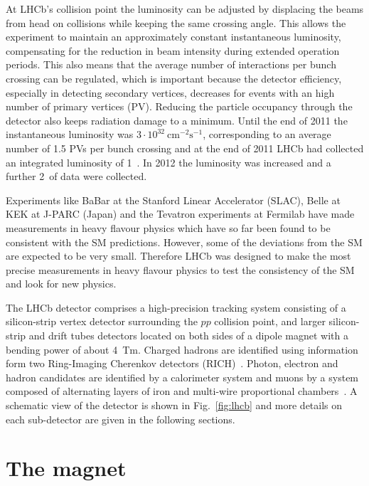 At LHCb's collision point the luminosity can be adjusted by displacing the beams from head on collisions
while keeping the same crossing angle. This allows the experiment to maintain an approximately constant instantaneous
luminosity, compensating for the reduction in beam intensity during extended operation periods. This also means that
the average number of interactions per bunch crossing can be regulated, which is important
because the detector efficiency, especially in detecting secondary vertices, decreases for events with an high number
of primary vertices (PV). Reducing the particle occupancy through the detector also keeps radiation damage to a minimum. 
Until the end of 2011 the instantaneous luminosity was $3 \cdot 10^{32}~\mbox{cm}^{-2}\mbox{s}^{-1}$, corresponding 
to an average number of 1.5 PVs per bunch crossing and at the end of 2011 LHCb had collected an integrated
luminosity of 1~\invfb. In 2012 the luminosity was increased and a further 2~\invfb of data were collected.

Experiments like BaBar at the Stanford Linear Accelerator (SLAC), Belle at KEK at J-PARC (Japan)
and the Tevatron experiments at Fermilab have made measurements in heavy flavour physics
which have so far been found to be consistent with the SM predictions. However, some of the deviations from the
SM are expected to be very small. Therefore LHCb was designed to make the most precise measurements
in heavy flavour physics to test the consistency of the SM and look for new physics.

The LHCb detector comprises a high-precision tracking system consisting of a silicon-strip
vertex detector surrounding the $pp$ collision point, and larger silicon-strip and drift tubes detectors located
on both sides of a dipole magnet with a bending power of about 4~Tm.
Charged hadrons are identified using information form two
Ring-Imaging Cherenkov detectors (RICH)~\cite{LHCb-DP-2012-003}. Photon, electron and hadron candidates are
identified by a calorimeter system and muons by a system composed of alternating layers of iron
and multi-wire proportional chambers~\cite{LHCb-DP-2012-002}. A schematic view of the detector is shown in Fig.~\ref{fig:lhcb}
and more details on each sub-detector are given in the following sections.

\section{The magnet}

